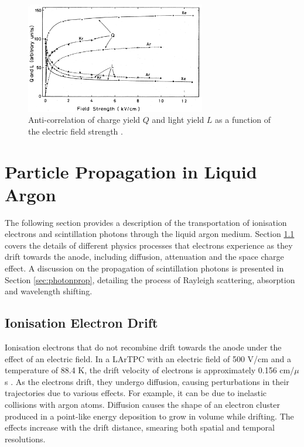 \begin{figure}[ht!] 
\centering    
\includegraphics[width=0.70\textwidth]{QLAnti}
\caption[Charge and Light Yield as a Function of Electric Field]{
Anti-correlation of charge yield $Q$ and light yield $L$ as a function of the electric field strength \cite{QLAnti}.
}
\label{fig:QLAnti}
\end{figure}

\section{Particle Propagation in Liquid Argon}
\label{sec3:propagation}

The following section provides a description of the transportation of ionisation electrons and scintillation photons through the liquid argon medium.
Section \ref{sec:edrift} covers the details of different physics processes that electrons experience as they drift towards the anode, including diffusion, attenuation and the space charge effect.
A discussion on the propagation of scintillation photons is presented in Section \ref{sec:photonprop}, detailing the process of Rayleigh scattering, absorption and wavelength shifting.

\subsection{Ionisation Electron Drift}
\label{sec:edrift}


Ionisation electrons that do not recombine drift towards the anode under the effect of an electric field.
In a LArTPC with an electric field of 500 V/cm and a temperature of 88.4 K, the drift velocity of electrons is approximately 0.156 cm/$\mu$s \cite{drift_vel}.
As the electrons drift, they undergo diffusion, causing perturbations in their trajectories due to various effects.
For example, it can be due to inelastic collisions with argon atoms.
Diffusion causes the shape of an electron cluster produced in a point-like energy deposition to grow in volume while drifting.
The effects increase with the drift distance, smearing both spatial and temporal resolutions. 

